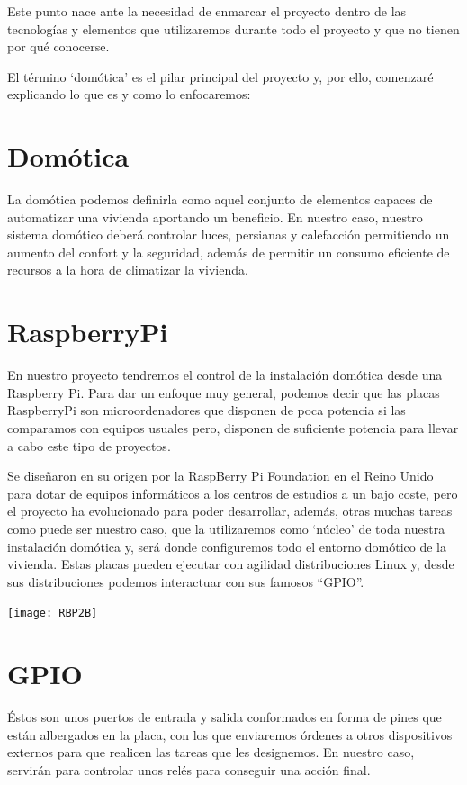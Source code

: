 
Este punto nace ante la necesidad de enmarcar el proyecto dentro de las tecnologías y elementos que utilizaremos durante todo el proyecto y que no tienen por qué conocerse.

El término ‘domótica’ es el pilar principal del proyecto y, por ello, comenzaré explicando lo que es y como lo enfocaremos:

\section{Domótica}
La domótica podemos definirla como aquel conjunto de elementos capaces de automatizar una vivienda aportando un beneficio.
En nuestro caso, nuestro sistema domótico deberá controlar luces, persianas y calefacción permitiendo un aumento del confort y la seguridad, además de permitir un consumo eficiente de recursos a la hora de climatizar la vivienda.

\section{RaspberryPi}
En nuestro proyecto tendremos el control de la instalación domótica desde una Raspberry Pi.
Para dar un enfoque muy general, podemos decir que las placas RaspberryPi son microordenadores que disponen de poca potencia si las comparamos con equipos usuales pero, disponen de suficiente potencia para llevar a cabo este tipo de proyectos.

Se diseñaron en su origen por la RaspBerry Pi Foundation en el Reino Unido para dotar de equipos informáticos a los centros de estudios a un bajo coste, pero el proyecto ha evolucionado para poder desarrollar, además, otras muchas tareas como puede ser nuestro caso, que la utilizaremos como ‘núcleo’ de toda nuestra instalación domótica y, será donde configuremos todo el entorno domótico de la vivienda.
Estas placas pueden ejecutar con agilidad distribuciones Linux y, desde sus distribuciones podemos interactuar con sus famosos “GPIO”.
  \begin{center}
  \texttt{[image: RBP2B]}
  \end{center}

\section{GPIO}
Éstos son unos puertos de entrada y salida conformados en forma de pines que están albergados en la placa, con los que enviaremos órdenes a otros dispositivos externos para que realicen las tareas que les designemos. En nuestro caso, servirán para controlar unos relés para conseguir una acción final.


